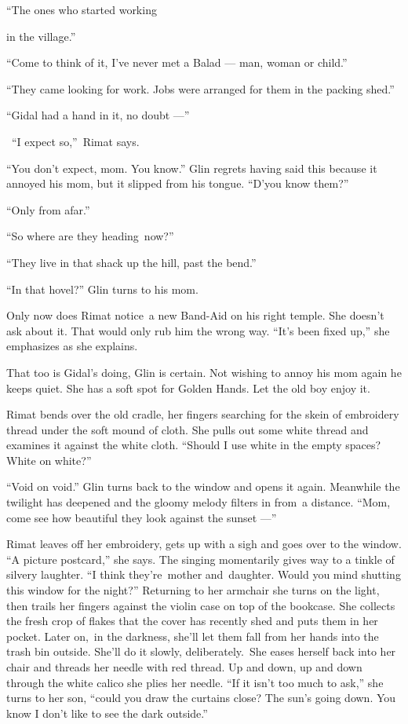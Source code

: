 \documentclass[twoside,11pt,openany]{book}
\begin{document}
``The ones who started working{ in the village.''

{``Come to think of it, I've never met a Balad --- man,
woman }or child.''

{{}``They came looking for work. Jobs were arranged for them in the
packing }shed{.''}

{}``Gidal had a hand in it, no doubt ---''

{~``}I expect
so{,''~Rimat says. }

``You
don't expect, mom.
You know.'' Glin regrets having said
this because it annoyed his  mom, but it slipped from his tongue.
``D'you know them?''

{}``Only from afar.''

{}``So where are they heading~now?''

{{}``They live in that shack up the
hill, }past{ the bend.''}

{{}``In that hovel?'' Glin turns }to his
mom{.}

{Only now does Rimat notice~a new
B}and-Aid {on his right temple. She doesn't ask about it. T}hat would
only rub him the wrong way{. ``It's been fixed up,{}'' she emphasizes
as she explains. }

{That too is Gidal's doing, Glin is certain. Not wishing to annoy his
}mom{ again he keeps quiet. She has a soft spot for Golden Hands. Let
the }old boy {enjoy it.}

{Rimat bends over the old cradle, her fingers searching for the
}skein {of embroidery thread under the soft mound of cloth. She
pulls }out some {white thread and examines it against the white
cloth. ``Should I use white in the }empty{ spaces? White on white?''}

{{}``Void on void.{}'' Glin
}turns{ back to the window and opens it again. Meanwhile the twilight
has deepened and the gloomy melody filters in from~a distance. ``Mom, come see how beautiful they look against the
sunset ---''}

{Rimat leaves off her embroidery, gets up with a sigh and goes over to
the window. ``A picture postcard,'' she says. The singing momentarily gives way to a tinkle of silvery laughter. ``I
think they're~mother and~daughter}. Would you mind shutting this window for the
night?{{}''
}Returning{ }{to her armchair
she turns on the light, }then trails her fingers {against the violin
case on }top of{ }{the
bookcase. She collects the fresh crop of flakes that the cover has recently shed and
}puts{ them in her pocket. Later on},~in the
darkness, {she'll let them fall from her hands into the trash
bin }outside{. She'll do it slowly, deliberately.~She eases herself
back into her chair and threads her needle with red thread. Up and down, up and down }through the white calico she
{plies her needle.  ``If it
isn't}{ }{too much to
ask,'' she }turns to her son, {``could you
}draw the curtains close? The sun's going down.{ You know I don't like
to see the dark} {outside.'' }

}
\end{document}
